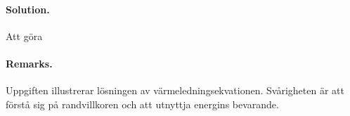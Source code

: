 \documentclass[%
oneside,                 %
final,                   %
10pt]{article}
\newenvironment{doconceexercise}{}{}
\begin{document}
\begin{doconceexercise}


\paragraph{Solution.}
Att göra



\paragraph{Remarks.}
Uppgiften illustrerar lösningen av värmeledningsekvationen. Svårigheten är att förstå sig på randvillkoren och att utnyttja energins bevarande.


\end{doconceexercise}


\end{document}
